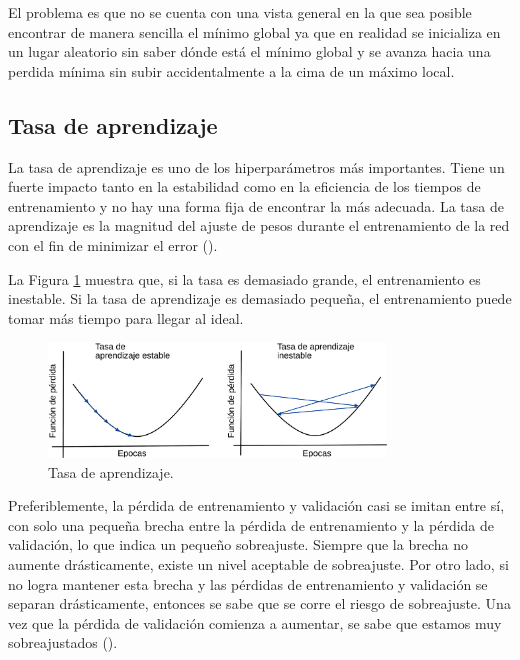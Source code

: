 El problema es que no se cuenta con una vista general en la que sea posible encontrar de manera sencilla el mínimo global ya que en realidad se inicializa en un lugar aleatorio sin saber dónde está el mínimo global y se avanza hacia una perdida mínima sin subir accidentalmente a la cima de un máximo local.

\subsection{Tasa de aprendizaje}

La tasa de aprendizaje es uno de los hiperparámetros más importantes. Tiene un fuerte impacto tanto en la estabilidad como en la eficiencia de los tiempos de entrenamiento y no hay una forma fija de encontrar la más adecuada. La tasa de aprendizaje es la magnitud del ajuste de pesos durante el entrenamiento de la red con el fin de minimizar el error (\cite{valenzuela2020Sistema}).

La Figura \ref{fig:learningRate} muestra que, si la tasa es demasiado grande, el entrenamiento es inestable. Si la tasa de aprendizaje es demasiado pequeña, el entrenamiento puede tomar más tiempo para llegar al ideal.

\begin{figure}[H]
    \centering
    \includegraphics[width=0.8\textwidth]{MarcoTeorico/imgs/LearningRate.png}
    \caption{Tasa de aprendizaje.}
    \label{fig:learningRate}
\end{figure}

Preferiblemente, la pérdida de entrenamiento y validación casi se imitan entre sí, con solo una pequeña brecha entre la pérdida de entrenamiento y la pérdida de validación, lo que indica un pequeño sobreajuste. Siempre que la brecha no aumente drásticamente, existe un nivel aceptable de sobreajuste. Por otro lado, si no logra mantener esta brecha y las pérdidas de entrenamiento y validación se separan drásticamente, entonces se sabe que se corre el riesgo de sobreajuste. Una vez que la pérdida de validación comienza a aumentar, se sabe que estamos muy sobreajustados (\cite{rosebrock2017deep}).


